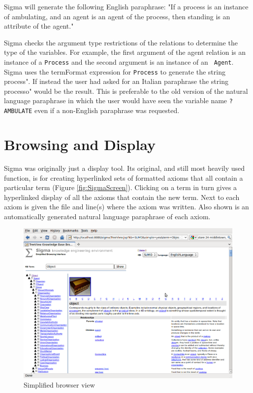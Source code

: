 \documentclass{book}
\begin{document}
Sigma will generate the following English paraphrase: "If a process is an
instance of ambulating, and an agent is an agent of the process, then standing
is an attribute of the agent."

Sigma checks the argument type restrictions of the relations to determine the
type of the variables.  For example, the first argument of the agent relation is
an instance of a {\tt Process} and the second argument is an instance of an {\tt
Agent}. Sigma uses the termFormat expression for {\tt Process} to generate the
string process".  If instead the user had asked for an Italian paraphrase the
string processo" would be the result.  This is preferable to the old version of
the natural language paraphrase in which the user would have seen the variable
name {\tt ?AMBULATE} even if a non-English paraphrase was requested.

\section{Browsing and Display}
\label{chap:KnowEngi:sec:Brow}

Sigma was originally just a display tool. Its original, and still most heavily
used function, is for creating hyperlinked sets of formatted axioms that all
contain a particular term (Figure \ref{fig:SigmaScreen}). Clicking on a term in
turn gives a hyperlinked display of all the axioms that contain the new term.
Next to each axiom is given the file and line(s) where the axiom was written.
Also shown is an automatically generated natural language paraphrase of each
axiom. 

\begin{figure}
  \centering
  \includegraphics[width=4.5in]{pictures/SigmaSimp.png}
  \caption{Simplified browser view}
  \label{fig:SigmaSimp}
\end{figure}
\end{document}
